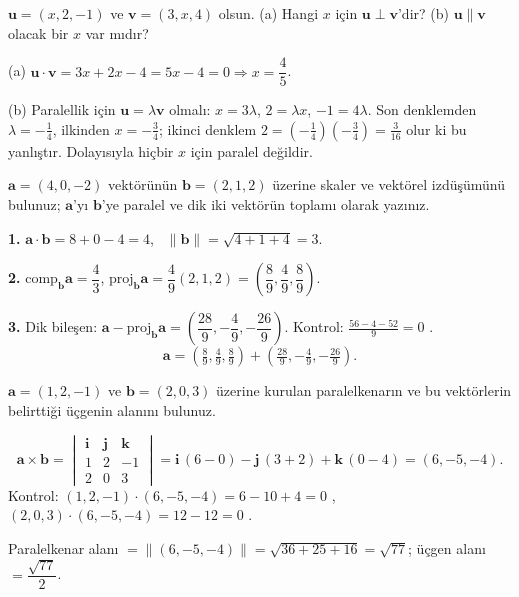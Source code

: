 \begin{soru}
$\mathbf u=(x,2,-1)$ ve $\mathbf v=(3,x,4)$ olsun. (a) Hangi $x$ için $\mathbf u\perp\mathbf v$'dir? (b) $\mathbf u\parallel\mathbf v$ olacak bir $x$ var mıdır?
\end{soru}
\begin{cevap}
(a) $\mathbf u\cdot\mathbf v=3x+2x-4=5x-4=0\Rightarrow x=\dfrac45$.

(b) Paralellik için $\mathbf u=\lambda\mathbf v$ olmalı: $x=3\lambda$, $2=\lambda x$, $-1=4\lambda$. Son denklemden $\lambda=-\frac14$, ilkinden $x=-\frac34$; ikinci denklem $2=\left(-\frac14\right)\left(-\frac34\right)=\frac{3}{16}$ olur ki bu yanlıştır. Dolayısıyla hiçbir $x$ için paralel değildir.
\end{cevap}

\begin{soru}
$\mathbf a=(4,0,-2)$ vektörünün $\mathbf b=(2,1,2)$ üzerine skaler ve vektörel izdüşümünü bulunuz; $\mathbf a$'yı $\mathbf b$'ye paralel ve dik iki vektörün toplamı olarak yazınız.
\end{soru}
\begin{cevap}
\textbf{1.} $\mathbf a\cdot\mathbf b=8+0-4=4$, \ $\|\mathbf b\|=\sqrt{4+1+4}=3$.

\textbf{2.} $\text{comp}_{\mathbf b}\mathbf a=\dfrac{4}{3}$, \quad $\text{proj}_{\mathbf b}\mathbf a=\dfrac{4}{9}(2,1,2)=\left(\dfrac89,\dfrac49,\dfrac89\right)$.

\textbf{3.} Dik bileşen: $\mathbf a-\text{proj}_{\mathbf b}\mathbf a=\left(\dfrac{28}{9},-\dfrac49,-\dfrac{26}{9}\right)$. Kontrol: $\frac{56-4-52}{9}=0$ \checkmark.
\[
\mathbf a=\left(\tfrac89,\tfrac49,\tfrac89\right)+\left(\tfrac{28}{9},-\tfrac49,-\tfrac{26}{9}\right).
\]
\end{cevap}

\begin{soru}
$\mathbf a=(1,2,-1)$ ve $\mathbf b=(2,0,3)$ üzerine kurulan paralelkenarın ve bu vektörlerin belirttiği üçgenin alanını bulunuz.
\end{soru}
\begin{cevap}
\[
\mathbf a\times\mathbf b=\begin{vmatrix}\mathbf i&\mathbf j&\mathbf k\\1&2&-1\\2&0&3\end{vmatrix}
=\mathbf i\,(6-0)-\mathbf j\,(3+2)+\mathbf k\,(0-4)=(6,-5,-4).
\]
Kontrol: $(1,2,-1)\cdot(6,-5,-4)=6-10+4=0$ \checkmark, \ $(2,0,3)\cdot(6,-5,-4)=12-12=0$ \checkmark.

Paralelkenar alanı $=\|(6,-5,-4)\|=\sqrt{36+25+16}=\sqrt{77}$; üçgen alanı $=\dfrac{\sqrt{77}}{2}$.
\end{cevap}

